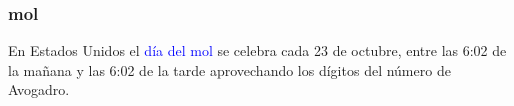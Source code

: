 \begin{frame}
\frametitle{mol}
En Estados Unidos el \textcolor{blue}{día del mol} se celebra cada 23 de octubre, entre las 6:02 de la mañana y las 6:02 de la tarde aprovechando los dígitos del número de Avogadro.
\end{frame}




